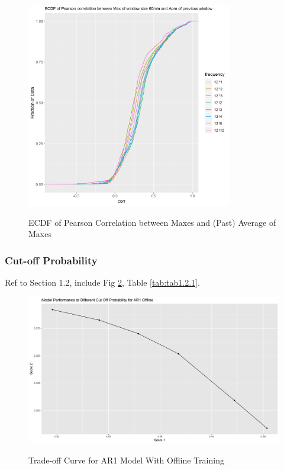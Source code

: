 \documentclass{article}
\begin{document}
\begin{figure}[htbp]
\caption{ECDF of Pearson Correlation between Maxes and (Past) Average of Maxes}
\centering
\includegraphics[width = 0.8\textwidth]{ECDFofPearsoncorrelationbetweenMaxofwindowsize60minandAomofpreviouswindow}
\label{fig:fig1.1.6}
\end{figure}

\subsubsection{Cut-off Probability}
Ref to Section 1.2, include Fig \ref{fig:fig1.2.1}, Table \ref{tab:tab1.2.1}.

\begin{figure}
    \caption{Trade-off Curve for AR1 Model With Offline Training}
    \centering
    \includegraphics{images/ModelPerformanceatDifferentCutOffProbabilityforAR1Offline.png}
    \label{fig:fig1.2.1}
\end{figure}
\end{document}
